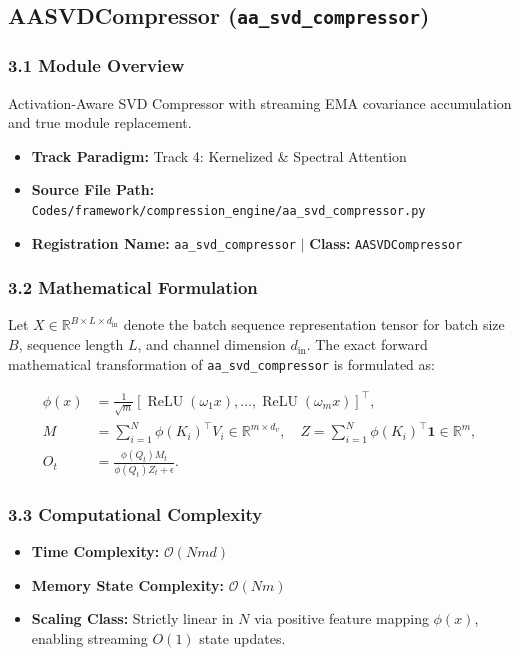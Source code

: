 \subsection{AASVDCompressor (\texttt{aa\_svd\_compressor})}
\label{sec:app_module_aa_svd_compressor}

\subsubsection*{3.1 Module Overview}
Activation-Aware SVD Compressor with streaming EMA covariance accumulation and true module replacement.
\begin{itemize}
    \item \textbf{Track Paradigm:} Track 4: Kernelized & Spectral Attention
    \item \textbf{Source File Path:} \texttt{Codes/framework/compression\_engine/aa\_svd\_compressor.py}
    \item \textbf{Registration Name:} \texttt{aa\_svd\_compressor} $\mid$ \textbf{Class:} \texttt{AASVDCompressor}
\end{itemize}

\subsubsection*{3.2 Mathematical Formulation}
Let $X \in \mathbb{R}^{B \times L \times d_{\text{in}}}$ denote the batch sequence representation tensor for batch size $B$, sequence length $L$, and channel dimension $d_{\text{in}}$. The exact forward mathematical transformation of \texttt{aa\_svd\_compressor} is formulated as:

\begin{align}
\phi(x) &= \frac{1}{\sqrt{m}} \left[ \operatorname{ReLU}(\omega_1 x), \dots, \operatorname{ReLU}(\omega_m x) \right]^\top, \\
M &= \sum_{i=1}^N \phi(K_i)^\top V_i \in \mathbb{R}^{m \times d_v}, \quad Z = \sum_{i=1}^N \phi(K_i)^\top \mathbf{1} \in \mathbb{R}^m, \\
O_t &= \frac{\phi(Q_t) M_t}{\phi(Q_t) Z_t + \epsilon}.
\end{align}


\subsubsection*{3.3 Computational Complexity}
\begin{itemize}
    \item \textbf{Time Complexity:} $\mathcal{O}(N m d)$
    \item \textbf{Memory State Complexity:} $\mathcal{O}(N m)$
    \item \textbf{Scaling Class:} Strictly linear in $N$ via positive feature mapping $\phi(x)$, enabling streaming $O(1)$ state updates.
\end{itemize}

